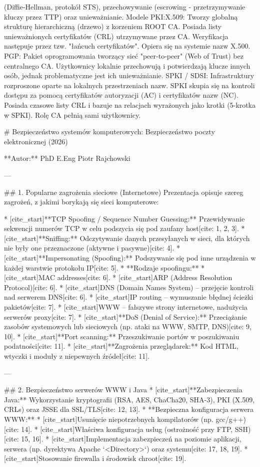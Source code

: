 (Diffie-Hellman, protokół STS), przechowywanie (escrowing - przetrzymywanie kluczy przez TTP) oraz unieważnianie.  Modele PKI:X.509: Tworzy globalną strukturę hierarchiczną (drzewo) z korzeniem ROOT CA. Posiada listy unieważnionych certyfikatów (CRL) utrzymywane przez CA. Weryfikacja następuje przez tzw. "łańcuch certyfikatów". Opiera się na systemie nazw X.500.  PGP: Pakiet oprogramowania tworzący sieć "peer-to-peer" (Web of Trust) bez centralnego CA. Użytkownicy lokalnie przechowują i potwierdzają klucze innych osób, jednak problematyczne jest ich unieważnianie.  SPKI / SDSI: Infrastruktury rozproszone oparte na lokalnych przestrzeniach nazw. SPKI skupia się na kontroli dostępu za pomocą certyfikatów autoryzacji (AC) i certyfikatów nazw (NC). Posiada czasowe listy CRL i bazuje na relacjach wyrażonych jako krotki (5-krotka w SPKI). Rolę CA pełnią sami użytkownicy.  

# Bezpieczeństwo systemów komputerowych: Bezpieczeństwo poczty elektronicznej (2026)

**Autor:** PhD E.Eng Piotr Rajchowski

---

## 1. Popularne zagrożenia sieciowe (Internetowe)
Prezentacja opisuje szereg zagrożeń, z jakimi borykają się sieci komputerowe:

* [cite_start]**TCP Spoofing / Sequence Number Guessing:** Przewidywanie sekwencji numerów TCP w celu podszycia się pod zaufany host[cite: 1, 2, 3].
* [cite_start]**Sniffing:** Odczytywanie danych przesyłanych w sieci, dla których nie były one przeznaczone (aktywne i pasywne)[cite: 4].
* [cite_start]**Impersonating (Spoofing):** Podszywanie się pod inne urządzenia w każdej warstwie protokołu IP[cite: 5].
* **Rodzaje spoofingu:**
    * [cite_start]MAC addresses[cite: 6].
    * [cite_start]ARP (Address Resolution Protocol)[cite: 6].
    * [cite_start]DNS (Domain Names System) – przejęcie kontroli nad serwerem DNS[cite: 6].
    * [cite_start]IP routing – wymuszanie błędnej ścieżki pakietów[cite: 7].
    * [cite_start]WWW – fałszywe strony internetowe, nadużycia serwerów proxy[cite: 7].
* [cite_start]**DoS (Denial of Service):** Przeciążanie zasobów systemowych lub sieciowych (np. ataki na WWW, SMTP, DNS)[cite: 9, 10].
* [cite_start]**Port scanning:** Przeszukiwanie portów w poszukiwaniu podatności[cite: 11].
* [cite_start]**Zagrożenia przeglądarek:** Kod HTML, wtyczki i moduły z niepewnych źródeł[cite: 11].

---

## 2. Bezpieczeństwo serwerów WWW i Java
* [cite_start]**Zabezpieczenia Java:** Wykorzystanie kryptografii (RSA, AES, ChaCha20, SHA-3), PKI (X.509, CRLs) oraz JSSE dla SSL/TLS[cite: 12, 13].
* **Bezpieczna konfiguracja serwera WWW:**
    * [cite_start]Usunięcie niepotrzebnych kompilatorów (np. gcc/g++)[cite: 14].
    * [cite_start]Właściwa konfiguracja usług (ostrożność przy FTP, SSH)[cite: 15, 16].
    * [cite_start]Implementacja zabezpieczeń na poziomie aplikacji, serwera (np. dyrektywa Apache `<Directory>`) oraz systemu[cite: 17, 18, 19].
    * [cite_start]Stosowanie firewalla i środowisk chroot[cite: 19].


